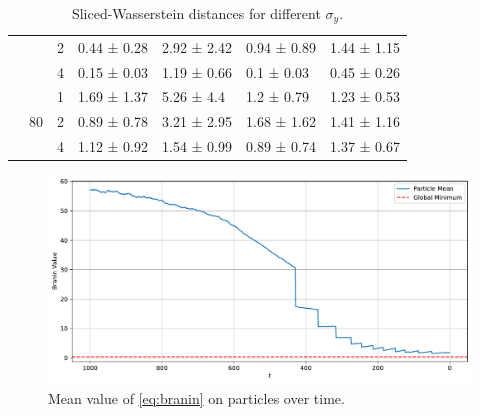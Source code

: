 \begin{table}[ht]
\begin{tabular}{lllllll}
         &  & 2 & 0.44 ± 0.28 & 2.92 ± 2.42 & 0.94 ± 0.89 & 1.44 ± 1.15 \\
         &  & 4 & 0.15 ± 0.03 & 1.19 ± 0.66 & 0.1 ± 0.03 & 0.45 ± 0.26 \\
        \cline{2-7}
         & \multirow[t]{3}{*}{80} & 1 & 1.69 ± 1.37 & 5.26 ± 4.4 & 1.2 ± 0.79 & 1.23 ± 0.53 \\
         &  & 2 & 0.89 ± 0.78 & 3.21 ± 2.95 & 1.68 ± 1.62 & 1.41 ± 1.16 \\
         &  & 4 & 1.12 ± 0.92 & 1.54 ± 0.99 & 0.89 ± 0.74 & 1.37 ± 0.67 \\
        \cline{1-7} \cline{2-7}
        \bottomrule
    \end{tabular}
    \caption{Sliced-Wasserstein distances for different $\sigma_y$.}
    \label{tab:gmm-sigma-split}
\end{table}

\begin{table}[ht]
    \centering
    \caption{Un-normalized scores for SuperConductor experiment}
    \label{tab:superconductor-unnorm}
\end{table}

\begin{figure}[t]
    \centering
    \includegraphics[width=1\textwidth]{assets/smc_branin_mean_val.pdf}
    \caption{Mean value of \autoref{eq:branin} on particles over time.}
    \label{fig:branin-mean-val}
\end{figure}

